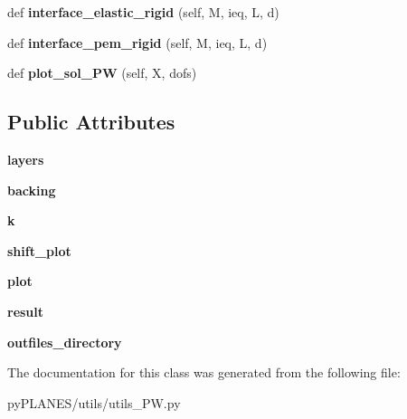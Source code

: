 \begin{DoxyCompactItemize}
def {\bfseries interface\+\_\+elastic\+\_\+rigid} (self, M, ieq, L, d)
\item 
\mbox{\label{classpy_p_l_a_n_e_s_1_1utils_1_1utils___p_w_1_1_solver___p_w_a03863718254b21889be4f8e4ab2ce5ee}} 
def {\bfseries interface\+\_\+pem\+\_\+rigid} (self, M, ieq, L, d)
\item 
\mbox{\label{classpy_p_l_a_n_e_s_1_1utils_1_1utils___p_w_1_1_solver___p_w_ac2be15b456dacc16909d0527a8c23e04}} 
def {\bfseries plot\+\_\+sol\+\_\+\+PW} (self, X, dofs)
\end{DoxyCompactItemize}
\subsection*{Public Attributes}
\begin{DoxyCompactItemize}
\item 
\mbox{\label{classpy_p_l_a_n_e_s_1_1utils_1_1utils___p_w_1_1_solver___p_w_ab26a1a4e82049dbd195375b0f79e40e5}} 
{\bfseries layers}
\item 
\mbox{\label{classpy_p_l_a_n_e_s_1_1utils_1_1utils___p_w_1_1_solver___p_w_a9b8719bba7a36ab3c27ca64f3cc72d30}} 
{\bfseries backing}
\item 
\mbox{\label{classpy_p_l_a_n_e_s_1_1utils_1_1utils___p_w_1_1_solver___p_w_a51d6873336355d7bb718058b571c4cff}} 
{\bfseries k}
\item 
\mbox{\label{classpy_p_l_a_n_e_s_1_1utils_1_1utils___p_w_1_1_solver___p_w_a50fd0129383834bb4e94637eafc8e5ba}} 
{\bfseries shift\+\_\+plot}
\item 
\mbox{\label{classpy_p_l_a_n_e_s_1_1utils_1_1utils___p_w_1_1_solver___p_w_a9f138ad814bb126c73e72b5598ab02a3}} 
{\bfseries plot}
\item 
\mbox{\label{classpy_p_l_a_n_e_s_1_1utils_1_1utils___p_w_1_1_solver___p_w_a2178308183f5de0f1eb5f43adcf71961}} 
{\bfseries result}
\item 
\mbox{\label{classpy_p_l_a_n_e_s_1_1utils_1_1utils___p_w_1_1_solver___p_w_aa449d46edc58cb8ab584265ad6fc42ed}} 
{\bfseries outfiles\+\_\+directory}
\end{DoxyCompactItemize}


The documentation for this class was generated from the following file\+:\begin{DoxyCompactItemize}
\item 
py\+P\+L\+A\+N\+E\+S/utils/utils\+\_\+\+P\+W.\+py\end{DoxyCompactItemize}

